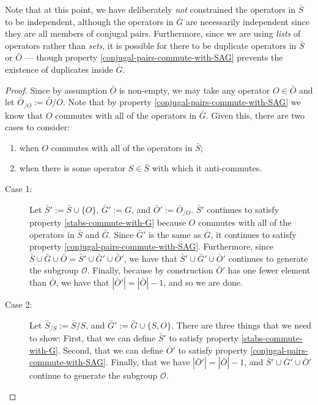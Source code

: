 \documentclass[twocolumn,showpacs,preprintnumbers,amsmath,amssymb,nofootinbib,pra,floatfix]{revtex4}
\newenvironment{remark}[1][Remark]{\begin{trivlist}
\item[\hskip \labelsep {\bfseries #1}]}{\end{trivlist}}
\begin{document}
\begin{remark}
Note that at this point, we have deliberately \emph{not} constrained the operators in $\bar S$ to be independent, although the operators in $\bar G$ are necessarily independent since they are all members of conjugal pairs.  Furthermore, since we are using \emph{lists} of operators rather than \emph{sets}, it is possible for there to be duplicate operators in $\bar S$ or $\bar O$ --- though property \ref{conjugal-pairs-commute-with-SAG} prevents the existence of duplicates inside $\bar G$.
\end{remark}

\begin{proof}
Since by assumption $\bar O$ is non-empty, we may take any operator $O\in \bar O$ and let $\bar O_{\slash O}:=\bar O\slash O$.  Note that by property \ref{conjugal-pairs-commute-with-SAG} we know that $O$ commutes with all of the operators in $\bar G$.  Given this, there are two cases to consider:
\begin{enumerate}
\item when $O$ commutes with all of the operators in $\bar S$;
\item when there is some operator $S\in\bar S$ with which it anti-commutes.
\end{enumerate}

\begin{description}
\item[Case 1:]
Let $\bar S':= \bar S \cup \{O\}$, $\bar G' := G$, and $\bar O' := \bar O_{\slash O}$.  $\bar S'$ continues to satisfy property \ref{stabs-commute-with-G} because $O$ commutes with all of the operators in $\bar S$ and $\bar G$.  Since $\bar G'$ is the same as $\bar G$, it continues to satisfy property \ref{conjugal-pairs-commute-with-SAG}.  Furthermore, since $\bar S\cup \bar G \cup \bar O=\bar S' \cup \bar G' \cup \bar O'$, we have that $\bar S' \cup \bar G' \cup \bar O'$ continues to generate the subgroup $\mathcal{O}$.  Finally, because by construction $\bar O'$ has one fewer element than $\bar O$, we have that $|\bar O'|=|\bar O|-1$, and so we are done.
\item[Case 2:]
Let $\bar S_{\slash S}:=\bar S\slash S$, and $\bar G' := \bar G \cup \{S,O\}$.  There are three things that we need to show:  First, that we can define $\bar S'$ to satisfy property \ref{stabs-commute-with-G}.  Second, that we can define $\bar O'$ to satisfy property \ref{conjugal-pairs-commute-with-SAG}.  Finally, that we have $|\bar O'|=|\bar O|-1$, and  $\bar S' \cup \bar G' \cup \bar O'$ continue to generate the subgroup $\mathcal{O}$.


\end{description}
\end{proof}
\end{document}
